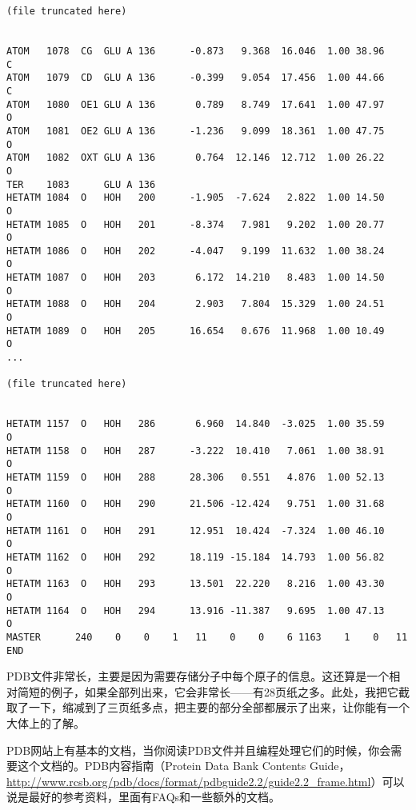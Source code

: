 \begin{lstlisting}
(file truncated here)


ATOM   1078  CG  GLU A 136      -0.873   9.368  16.046  1.00 38.96           C  
ATOM   1079  CD  GLU A 136      -0.399   9.054  17.456  1.00 44.66           C  
ATOM   1080  OE1 GLU A 136       0.789   8.749  17.641  1.00 47.97           O  
ATOM   1081  OE2 GLU A 136      -1.236   9.099  18.361  1.00 47.75           O  
ATOM   1082  OXT GLU A 136       0.764  12.146  12.712  1.00 26.22           O  
TER    1083      GLU A 136                                                      
HETATM 1084  O   HOH   200      -1.905  -7.624   2.822  1.00 14.50           O  
HETATM 1085  O   HOH   201      -8.374   7.981   9.202  1.00 20.77           O  
HETATM 1086  O   HOH   202      -4.047   9.199  11.632  1.00 38.24           O  
HETATM 1087  O   HOH   203       6.172  14.210   8.483  1.00 14.50           O  
HETATM 1088  O   HOH   204       2.903   7.804  15.329  1.00 24.51           O  
HETATM 1089  O   HOH   205      16.654   0.676  11.968  1.00 10.49           O  
... 

(file truncated here)


HETATM 1157  O   HOH   286       6.960  14.840  -3.025  1.00 35.59           O  
HETATM 1158  O   HOH   287      -3.222  10.410   7.061  1.00 38.91           O  
HETATM 1159  O   HOH   288      28.306   0.551   4.876  1.00 52.13           O  
HETATM 1160  O   HOH   290      21.506 -12.424   9.751  1.00 31.68           O  
HETATM 1161  O   HOH   291      12.951  10.424  -7.324  1.00 46.10           O  
HETATM 1162  O   HOH   292      18.119 -15.184  14.793  1.00 56.82           O  
HETATM 1163  O   HOH   293      13.501  22.220   8.216  1.00 43.30           O  
HETATM 1164  O   HOH   294      13.916 -11.387   9.695  1.00 47.13           O  
MASTER      240    0    0    1   11    0    0    6 1163    1    0   11          
END                                                                  
\end{lstlisting}

PDB文件非常长，主要是因为需要存储分子中每个原子的信息。这还算是一个相对简短的例子，如果全部列出来，它会非常长——有28页纸之多。此处，我把它截取了一下，缩减到了三页纸多点，把主要的部分全部都展示了出来，让你能有一个大体上的了解。

PDB网站上有基本的文档，当你阅读PDB文件并且编程处理它们的时候，你会需要这个文档的。PDB内容指南（Protein Data Bank Contents Guide，\href{http://www.rcsb.org/pdb/docs/format/pdbguide2.2/guide2.2\_frame.html}{http://www.rcsb.org/pdb/docs/format/pdbguide2.2/guide2.2\_frame.html}）可以说是最好的参考资料，里面有FAQs和一些额外的文档。 

